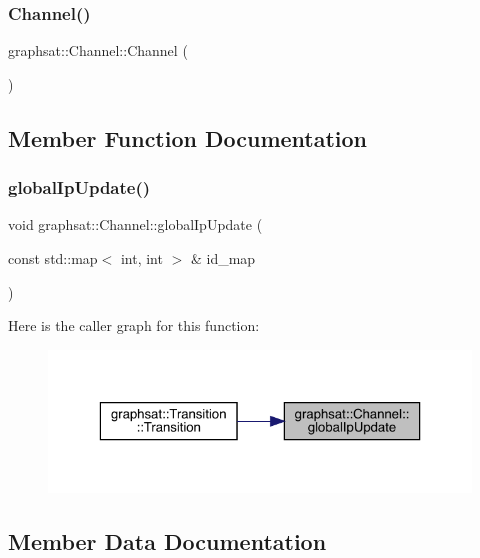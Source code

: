 \subsubsection{\texorpdfstring{Channel()}{Channel()}}
{\footnotesize\ttfamily graphsat\+::\+Channel\+::\+Channel (\begin{DoxyParamCaption}{ }\end{DoxyParamCaption})\hspace{0.3cm}{\ttfamily [inline]}}



\subsection{Member Function Documentation}
\mbox{\label{structgraphsat_1_1_channel_a334cfc78cfcb728f178d2566a639b6f6}} 
\subsubsection{\texorpdfstring{globalIpUpdate()}{globalIpUpdate()}}
{\footnotesize\ttfamily void graphsat\+::\+Channel\+::global\+Ip\+Update (\begin{DoxyParamCaption}\item[{const std\+::map$<$ int, int $>$ \&}]{id\+\_\+map }\end{DoxyParamCaption})\hspace{0.3cm}{\ttfamily [inline]}}

Here is the caller graph for this function\+:
\nopagebreak
\begin{figure}[H]
\begin{center}
\leavevmode
\includegraphics[width=323pt]{structgraphsat_1_1_channel_a334cfc78cfcb728f178d2566a639b6f6_icgraph}
\end{center}
\end{figure}


\subsection{Member Data Documentation}
\mbox{\label{structgraphsat_1_1_channel_ad8c5ffd4866ae5cc5edaa0e643e10b95}} 
